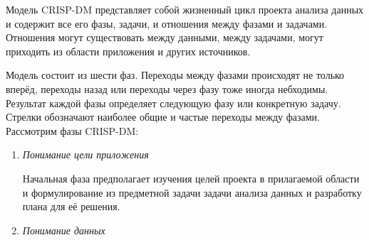 Модель CRISP-DM представляет собой жизненный цикл проекта анализа данных и содержит все его фазы, задачи, и отношения между фазами и задачами. Отношения могут существовать между данными, между задачами, могут приходить из области приложения и других источников. 

Модель состоит из шести фаз. Переходы между фазами происходят не только вперёд, переходы назад или переходы через фазу тоже иногда небходимы. Результат каждой фазы определяет следующую фазу или конкретную задачу. Стрелки обозначают наиболее общие и частые переходы между фазами. Рассмотрим фазы CRISP-DM:
\begin{enumerate}
	\item \textit{Понимание цели приложения}

	Начальная фаза предполагает изучения целей проекта в прилагаемой области и формулирование из предметной задачи задачи анализа данных и разработку плана для её решения.
	\item \textit{Понимание данных}

	
\end{enumerate}  